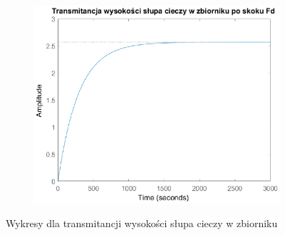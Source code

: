 \begin{figure}[h!]
   \begin{subfigure}[b]{0.6\textwidth}
      \includegraphics[width=1\linewidth]{img/transforms/transformHFd.eps}
      \caption{}
      \label{fig:fig:transformH3}
   \end{subfigure}
       
   \caption{Wykresy dla transmitancji wysokości słupa cieczy w zbiorniku}
   \label{fig:transformH}
\end{figure}
           
